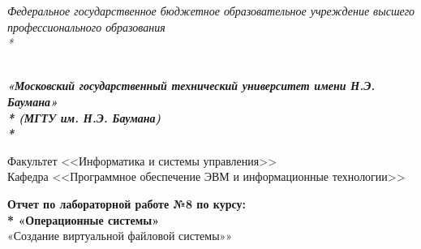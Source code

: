 \newpage
\begin{titlepage}
	\thispagestyle{empty}
	
	{\large
		\begin{center}
			\textsl{Федеральное государственное бюджетное образовательное учреждение высшего профессионального образования \\* }	
			\vspace{2em}
		\end{center}
	}
	{
		\begin{minipage}[t]{0.13\textwidth}
			\centering{}
			\label{fig0}
		\end{minipage}\hfill
		\begin{minipage}[t]{0.65\textwidth}
			\begin{center}
				\large  \textsl{\textbf {\\ «Московский государственный технический университет имени Н.Э. Баумана» \\* (МГТУ им. Н.Э. Баумана) \\* }}
			\end{center}
		\end{minipage}
	}
	
	\vspace{2em}
	
	\hrulefill
	
	\begin{center}
		\vspace{0pt plus2fill} %
		{\large
			Факультет  <<Информатика и системы управления>>\\
			Кафедра  <<Программное обеспечение ЭВМ и информационные технологии>>
		}
	\end{center}
	
	{\Large
		\begin{center}
			\textbf{Отчет по лабораторной работе №8 по курсу: \\*  «Операционные системы»} \\
			«Создание виртуальной файловой системы»»
		\end{center}
	}
	\vspace{0pt plus4fill} %
	

\end{titlepage}

